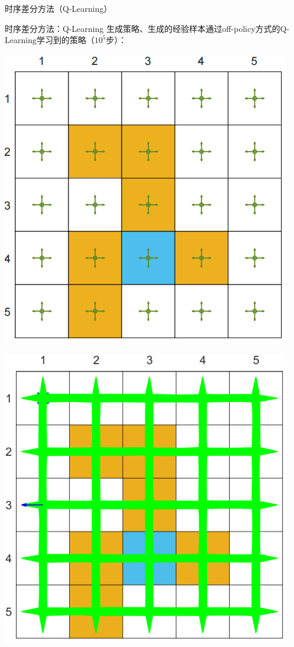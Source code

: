 \begin{section}{时序差分方法\alert{（Q-Learning）}}
\begin{frame}{时序差分方法：Q-Learning}
    生成策略、生成的经验样本通过off-policy方式的Q-Learning学习到的策略（$10^5$步）：
    \begin{center}
        \begin{minipage}{0.2\textwidth}
            \centering
            \includegraphics[width=\linewidth]{assets/e1policy.jpg}
        \end{minipage}
        \hspace{1cm}
        \begin{minipage}{0.2\textwidth}
            \centering
            \includegraphics[width=\linewidth]{assets/e1episode.jpg}

\end{minipage}
\end{center}
\end{frame}
\end{section}
